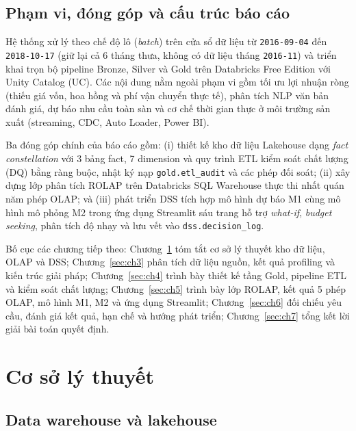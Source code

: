 \documentclass[a4paper]{article}
\begin{document}
\subsection{Phạm vi, đóng góp và cấu trúc báo cáo}
\label{subsec:1_4}

Hệ thống xử lý theo chế độ lô (\textit{batch}) trên cửa sổ dữ liệu từ \texttt{2016-09-04} đến \texttt{2018-10-17} (giữ lại cả 6 tháng thưa, không có dữ liệu tháng \texttt{2016-11}) và triển khai trọn bộ pipeline Bronze, Silver và Gold trên Databricks Free Edition với Unity Catalog (UC). Các nội dung nằm ngoài phạm vi gồm tối ưu lợi nhuận ròng (thiếu giá vốn, hoa hồng và phí vận chuyển thực tế), phân tích NLP văn bản đánh giá, dự báo nhu cầu toàn sàn và cơ chế thời gian thực ở môi trường sản xuất (streaming, CDC, Auto Loader, Power BI).

Ba đóng góp chính của báo cáo gồm: (i) thiết kế kho dữ liệu Lakehouse dạng \textit{fact constellation} với 3 bảng fact, 7 dimension và quy trình ETL kiểm soát chất lượng (DQ) bằng ràng buộc, nhật ký nạp \texttt{gold.etl\_audit} và các phép đối soát; (ii) xây dựng lớp phân tích ROLAP trên Databricks SQL Warehouse thực thi nhất quán năm phép OLAP; và (iii) phát triển DSS tích hợp mô hình dự báo M1 cùng mô hình mô phỏng M2 trong ứng dụng Streamlit sáu trang hỗ trợ \textit{what-if}, \textit{budget seeking}, phân tích độ nhạy và lưu vết vào \texttt{dss.decision\_log}.

Bố cục các chương tiếp theo: Chương~\ref{sec:ch2} tóm tắt cơ sở lý thuyết kho dữ liệu, OLAP và DSS; Chương~\ref{sec:ch3} phân tích dữ liệu nguồn, kết quả profiling và kiến trúc giải pháp; Chương~\ref{sec:ch4} trình bày thiết kế tầng Gold, pipeline ETL và kiểm soát chất lượng; Chương~\ref{sec:ch5} trình bày lớp ROLAP, kết quả 5 phép OLAP, mô hình M1, M2 và ứng dụng Streamlit; Chương~\ref{sec:ch6} đối chiếu yêu cầu, đánh giá kết quả, hạn chế và hướng phát triển; Chương~\ref{sec:ch7} tổng kết lời giải bài toán quyết định.

\section{Cơ sở lý thuyết}
\label{sec:ch2}

\subsection{Data warehouse và lakehouse}
\label{subsec:2_1}
\end{document}
